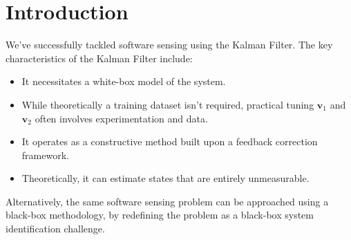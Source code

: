 \section{Introduction}

We've successfully tackled software sensing using the Kalman Filter.
The key characteristics of the Kalman Filter include:
\begin{itemize}
    \item It necessitates a white-box model of the system.
    \item While theoretically a training dataset isn't required, practical tuning $\mathbf{v}_1$ and $\mathbf{v}_2$ often involves experimentation and data.
    \item It operates as a constructive method built upon a feedback correction framework.
    \item Theoretically, it can estimate states that are entirely unmeasurable.
\end{itemize}
Alternatively, the same software sensing problem can be approached using a black-box methodology, by redefining the problem as a black-box system identification challenge.